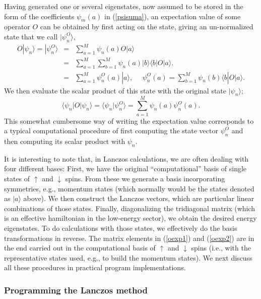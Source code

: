 \documentclass[draft,numberedheadings]{aipproc}
\newcommand{\dn}{\downarrow}
\newcommand{\up}{\uparrow}
\begin{document}
Having generated one or several eigenstates, now assumed to be stored in the form of the coefficients $\psi_m(a)$ in (\ref{psisuma}), an expectation value of 
some operator $O$ can be obtained by first acting on the state, giving an un-normalized state that we call $|\psi^O_n \rangle$,
\begin{eqnarray}
O|\psi_n \rangle = |\psi^O_n \rangle & = & \sum_{a=1}^M \psi_n(a) O | a \rangle \nonumber \\
& = & \sum_{a=1}^M\sum_{b=1}^M \psi_n(a) |b\rangle\langle b|O| a \rangle. \label{oexp1} \\
& = & \sum_{a=1}^M \psi^O_n(a) | a \rangle,~~~~~~ \psi^O_n(a) = \sum_{b=1}^M \psi_n(b) \langle b|O| a \rangle.\nonumber
\end{eqnarray}
We then evaluate the scalar product of this state with the original state $|\psi_n \rangle$;
\begin{equation}
\langle \psi_n|O|\psi_n \rangle =  \langle \psi_n|\psi^O_n \rangle = \sum_{a=1}^M \psi_n(a)  \psi^O_n(a) .
\label{oexp2}
\end{equation}
This somewhat cumbersome way of writing the expectation value corresponds to a typical computational procedure of first computing the state
vector $\psi^O_n$ and then computing its scalar product with $\psi_n$.

It is interesting to note that, in Lanczos calculations, we are often dealing with four different bases: First, we have the original ``computational'' 
basis of single states of $\up$ and $\dn$ spins. From these we generate a basis incorporating symmetries, e.g., momentum states (which normally would
be the states denoted as $|a\rangle$ above). We then construct the Lanczos vectors, which are particular linear combinations of those states. Finally, 
diagonalizing the tridiagonal matrix (which is an effective hamiltonian in the low-energy sector), we obtain the desired energy eigenstates. To do 
calculations with those states, we effectively do the basis transformations in reverse. The matrix elements in (\ref{oexp1}) and (\ref{oexp2}) are 
in the end carried out in the computational basis of $\up$ and $\dn$ spins (i.e., with the representative states used, e.g., to build the momentum states). 
We next discuss all these procedures in practical program implementations.

\subsubsection{Programming the Lanczos method}
\end{document}
